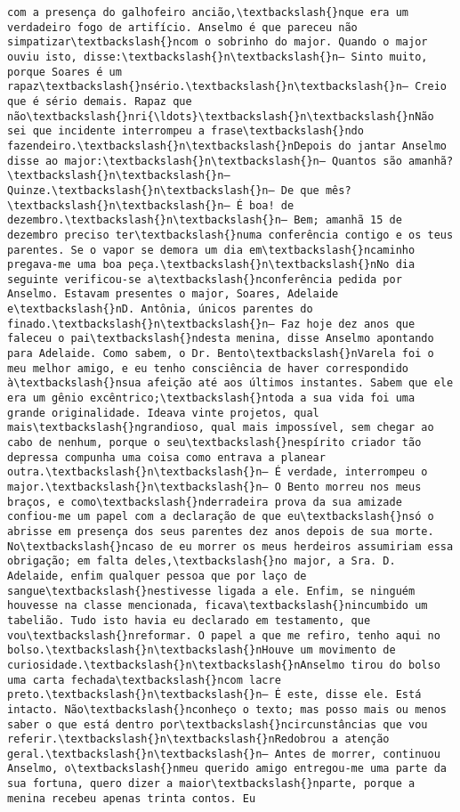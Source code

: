 \begin{Verbatim}[commandchars=\\\{\}]
com a presença do galhofeiro ancião,\textbackslash{}nque era um verdadeiro fogo de artifício. Anselmo é que pareceu não simpatizar\textbackslash{}ncom o sobrinho do major. Quando o major ouviu isto, disse:\textbackslash{}n\textbackslash{}n— Sinto muito, porque Soares é um rapaz\textbackslash{}nsério.\textbackslash{}n\textbackslash{}n— Creio que é sério demais. Rapaz que não\textbackslash{}nri{\ldots}\textbackslash{}n\textbackslash{}nNão sei que incidente interrompeu a frase\textbackslash{}ndo fazendeiro.\textbackslash{}n\textbackslash{}nDepois do jantar Anselmo disse ao major:\textbackslash{}n\textbackslash{}n— Quantos são amanhã?\textbackslash{}n\textbackslash{}n— Quinze.\textbackslash{}n\textbackslash{}n— De que mês?\textbackslash{}n\textbackslash{}n— É boa! de dezembro.\textbackslash{}n\textbackslash{}n— Bem; amanhã 15 de dezembro preciso ter\textbackslash{}numa conferência contigo e os teus parentes. Se o vapor se demora um dia em\textbackslash{}ncaminho pregava-me uma boa peça.\textbackslash{}n\textbackslash{}nNo dia seguinte verificou-se a\textbackslash{}nconferência pedida por Anselmo. Estavam presentes o major, Soares, Adelaide e\textbackslash{}nD. Antônia, únicos parentes do finado.\textbackslash{}n\textbackslash{}n— Faz hoje dez anos que faleceu o pai\textbackslash{}ndesta menina, disse Anselmo apontando para Adelaide. Como sabem, o Dr. Bento\textbackslash{}nVarela foi o meu melhor amigo, e eu tenho consciência de haver correspondido à\textbackslash{}nsua afeição até aos últimos instantes. Sabem que ele era um gênio excêntrico;\textbackslash{}ntoda a sua vida foi uma grande originalidade. Ideava vinte projetos, qual mais\textbackslash{}ngrandioso, qual mais impossível, sem chegar ao cabo de nenhum, porque o seu\textbackslash{}nespírito criador tão depressa compunha uma coisa como entrava a planear outra.\textbackslash{}n\textbackslash{}n— É verdade, interrompeu o major.\textbackslash{}n\textbackslash{}n— O Bento morreu nos meus braços, e como\textbackslash{}nderradeira prova da sua amizade confiou-me um papel com a declaração de que eu\textbackslash{}nsó o abrisse em presença dos seus parentes dez anos depois de sua morte. No\textbackslash{}ncaso de eu morrer os meus herdeiros assumiriam essa obrigação; em falta deles,\textbackslash{}no major, a Sra. D. Adelaide, enfim qualquer pessoa que por laço de sangue\textbackslash{}nestivesse ligada a ele. Enfim, se ninguém houvesse na classe mencionada, ficava\textbackslash{}nincumbido um tabelião. Tudo isto havia eu declarado em testamento, que vou\textbackslash{}nreformar. O papel a que me refiro, tenho aqui no bolso.\textbackslash{}n\textbackslash{}nHouve um movimento de curiosidade.\textbackslash{}n\textbackslash{}nAnselmo tirou do bolso uma carta fechada\textbackslash{}ncom lacre preto.\textbackslash{}n\textbackslash{}n— É este, disse ele. Está intacto. Não\textbackslash{}nconheço o texto; mas posso mais ou menos saber o que está dentro por\textbackslash{}ncircunstâncias que vou referir.\textbackslash{}n\textbackslash{}nRedobrou a atenção geral.\textbackslash{}n\textbackslash{}n— Antes de morrer, continuou Anselmo, o\textbackslash{}nmeu querido amigo entregou-me uma parte da sua fortuna, quero dizer a maior\textbackslash{}nparte, porque a menina recebeu apenas trinta contos. Eu 
\end{Verbatim}
